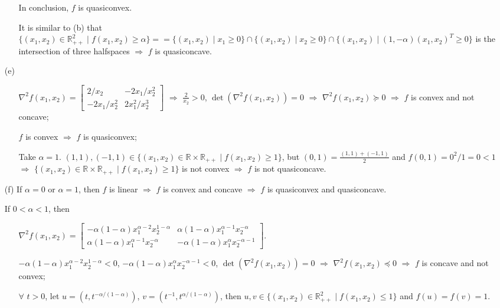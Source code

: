 \documentclass[11pt,letter,notitlepage]{article}
\theoremstyle{definition}
\begin{document}
\begin{solution}
\begin{enumerate}
\begin{enumerate}
            In conclusion, $f$ is quasiconvex.
            \item[\ding{174}] It is similar to (b) that $\{(x_1,x_2) \in \mathbb{R}_{++}^2 \mid f(x_1,x_2) \ge \alpha\} = = \{(x_1,x_2) \mid x_1 \geq 0\} \cap \{(x_1,x_2) \mid x_2 \geq 0\} \cap \{(x_1,x_2) \mid (1,-\alpha) (x_1,x_2)^T \geq 0\}$ is the intersection of three halfspaces $\Longrightarrow$ $f$ is quasiconcave.
        \end{enumerate}
        \item[(e)]
        \begin{enumerate}
            \item[\ding{172}] $\nabla^2 f(x_1,x_2) = \begin{bmatrix}2/x_2 & -2 x_1/x_2^2 \\ -2 x_1/x_2^2 & 2 x_1^2/x_2^3\end{bmatrix}$ $\Longrightarrow$ $\frac{2}{x_2} > 0$, $\det(\nabla^2 f(x_1,x_2)) = 0$ $\Longrightarrow$ $\nabla^2 f(x_1,x_2) \succeq 0$ $\Longrightarrow$ $f$ is convex and not concave;
            \item[\ding{173}] $f$ is convex $\Longrightarrow$ $f$ is quasiconvex;
            \item[\ding{174}] Take $\alpha = 1$. $(1,1), (-1,1) \in \{(x_1,x_2) \in \mathbb{R}\times\mathbb{R}_{++} \mid f(x_1,x_2) \ge 1\}$, but $(0,1) = \frac{(1,1)+(-1,1)}{2}$ and $f(0,1) = 0^2/1 = 0 < 1$ $\Longrightarrow$ $\{(x_1,x_2) \in \mathbb{R}\times\mathbb{R}_{++} \mid f(x_1,x_2) \ge 1\}$ is not convex $\Longrightarrow$ $f$ is not quasiconcave.
        \end{enumerate}
        \item[(f)]
            If $\alpha = 0$ or $\alpha = 1$, then $f$ is linear $\Longrightarrow$ $f$ is convex and concave $\Longrightarrow$ $f$ is quasiconvex and quasiconcave.

            If $0 < \alpha < 1$, then
        \begin{enumerate}
            \item[\ding{172}] $\nabla^2 f(x_1,x_2) = \begin{bmatrix} -\alpha(1-\alpha)x_1^{\alpha-2} x_2^{1-\alpha} & \alpha(1-\alpha)x_1^{\alpha-1} x_2^{-\alpha} \\ \alpha(1-\alpha)x_1^{\alpha-1} x_2^{-\alpha} & -\alpha(1-\alpha)x_1^\alpha x_2^{-\alpha-1}\end{bmatrix}$. 
            
            $-\alpha(1-\alpha)x_1^{\alpha-2} x_2^{1-\alpha} < 0$, $-\alpha(1-\alpha)x_1^\alpha x_2^{-\alpha-1} < 0$, $\det(\nabla^2 f(x_1,x_2)) = 0$ $\Longrightarrow$ $\nabla^2 f(x_1,x_2) \preceq 0$ $\Longrightarrow$ $f$ is concave and not convex;
            \item[\ding{173}] $\forall$ $t > 0$, let $u = (t, t^{-\alpha/(1-\alpha)})$, $v = (t^{-1}, t^{\alpha/(1-\alpha)})$, then $u, v \in \{(x_1,x_2) \in \mathbb{R}_{++}^2 \mid f(x_1,x_2) \le 1\}$ and $f(u) = f(v) = 1$. 
            

\end{enumerate}
\end{enumerate}
\end{solution}
\end{document}
